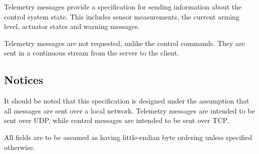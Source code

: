 Telemetry messages provide a specification for sending information about the control system state. This includes sensor
measurements, the current arming level, actuator states and warning messages.

Telemetry messages are not requested, unlike the control commands. They are sent in a continuous stream from the server
to the client.

\subsection{Notices}

It should be noted that this specification is designed under the assumption that all messages are sent over a local
network. Telemetry messages are intended to be sent over UDP, while control messages are intended to be sent over TCP.

All fields are to be assumed as having little-endian byte ordering unless specified otherwise.
